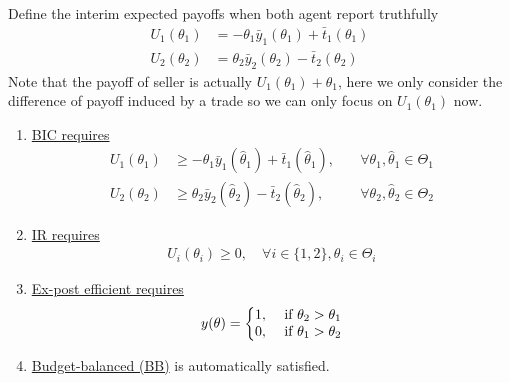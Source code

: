 \documentclass[11pt]{elegantbook}
\begin{document}
Define the interim expected payoffs when both agent report truthfully
\begin{equation}
    \begin{aligned}
        U_1(\theta_1)&=-\theta_1\bar{y}_1(\theta_1)+\bar{t}_1(\theta_1)\\
        U_2(\theta_2)&=\theta_2\bar{y}_2(\theta_2)-\bar{t}_2(\theta_2)
    \end{aligned}
    \nonumber
\end{equation}
Note that the payoff of seller is actually $U_1(\theta_1)+\theta_1$, here we only consider the difference of payoff induced by a trade so we can only focus on $U_1(\theta_1)$ now.
\begin{enumerate}
    \item \underline{BIC requires}
    \begin{equation}
        \begin{aligned}
            U_1(\theta_1)&\geq-\theta_1\bar{y}_1(\hat{\theta}_1)+\bar{t}_1(\hat{\theta}_1),\quad &\forall \theta_1,\hat{\theta}_1\in\Theta_1\\
            U_2(\theta_2)&\geq\theta_2\bar{y}_2(\hat{\theta}_2)-\bar{t}_2(\hat{\theta}_2),\quad &\forall \theta_2,\hat{\theta}_2\in\Theta_2
        \end{aligned}
        \nonumber
    \end{equation}
    \item \underline{IR requires}
    \begin{equation}
        \begin{aligned}
            U_i(\theta_i)\geq 0,\quad \forall i\in\{1,2\},\theta_i\in\Theta_i
        \end{aligned}
        \nonumber
    \end{equation}
    \item \underline{Ex-post efficient requires}
    \begin{equation}
        \begin{aligned}
            y(\theta)=\left\{\begin{matrix}
                1,& \textnormal{ if }\theta_2>\theta_1\\
                0,& \textnormal{ if }\theta_1>\theta_2
            \end{matrix}\right.
        \end{aligned}
        \nonumber
    \end{equation}
    \item \underline{Budget-balanced (BB)} is automatically satisfied.
\end{enumerate}
\end{document}
